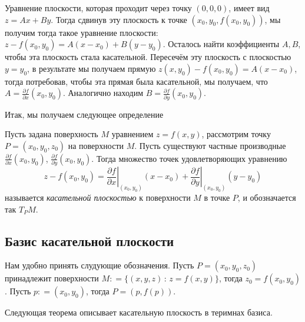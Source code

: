 Уравнение плоскости, которая проходит через точку $(0,0,0)$, имеет вид $z = Ax + By$. Тогда сдвинув эту плоскость к точке $(x_0, y_0, f(x_0,y_0))$, мы получим тогда такое уравнение плоскости: $z - f(x_0,y_0) = A(x-x_0) + B(y-y_0)$. Осталось найти коэффициенты $A,B$, чтобы эта плоскость стала касательной. Пересечём эту плоскость с плоскостью $y=y_0$, в результате мы получаем прямую $z(x, y_0) - f(x_0,y_0) = A(x-x_0)$, тогда потребовав, чтобы эта прямая была касательной, мы получаем, что $A = \frac{\partial f}{\partial x}(x_0,y_0)$. Аналогично находим $B = \frac{\partial f}{\partial y}(x_0,y_0)$.

Итак, мы получаем следующее определение
\begin{definition}
 Пусть задана поверхность $M$ уравнением $z  = f(x,y)$, рассмотрим точку $P=(x_0,y_0,z_0)$ на поверхности $M$. Пусть существуют частные производные $\frac{\partial f}{\partial x}(x_0,y_0)$, $\frac{\partial f}{\partial y}(x_0,y_0)$. Тогда множество точек удовлетворяющих уравнению 
 \[
z - f(x_0,y_0) = \left.\frac{\partial f}{\partial x}\right|_{(x_0,y_0)} (x-x_0) + \left.\frac{\partial f}{\partial y}\right|_{(x_0,y_0)} (y-y_0)
\]
называется \textit{касательной плоскостью} к поверхности $M$ в точке $P$, и обозначается так $T_PM$.
\end{definition}



\subsection{Базис касательной плоскости}
Нам удобно принять слудующие обозначения. Пусть $P = (x_0,y_0,z_0)$ принадлежит поверхности $M : =\{(x,y,z)\, : \, z  = f(x,y) \} $, тогда $z_0 = f(x_0,y_0)$. Пусть $p: = (x_0,y_0)$, тогда $P = (p, f(p))$.

Следующая теорема описывает касательную плоскость в теримнах базиса.

